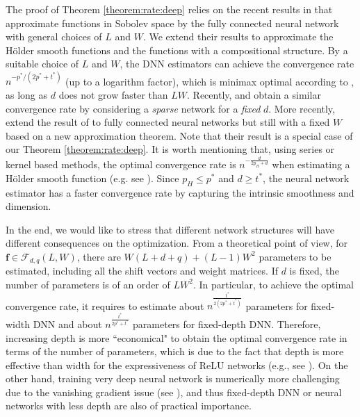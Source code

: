 \documentclass[11pt, preprint]{imsart}
\numberwithin{equation}{section}
\def \mcF{\mathcal{F}}
\def \bff{\mathbf{f}}
\def \bff{\mathbf{f}}
\theoremstyle{plain}
\newtheorem{theorem}{\indent Theorem}
\theoremstyle{definition}
\begin{document}
The proof of Theorem \ref{theorem:rate:deep} relies on the recent results in \cite{lsyz20} that approximate functions in Sobolev space by the fully connected neural network with general choices of $L$ and $W$. We extend their results to approximate the H\" older smooth functions and the functions with a compositional structure. By a suitable choice of $L$ and $W$, the DNN estimators can achieve the convergence rate $n^{-p^*/(2p^*+t^*)}$ (up to a logarithm factor), which is minimax optimal according to \cite{s19}, as long as $d$ does not grow faster than $LW$. Recently, \cite{bk19} and \cite{s19} obtain a similar convergence rate by considering a {\em sparse} network for a {\em fixed} $d$. More recently, \cite{mk19} extend the result of \cite{bk19} to fully connected neural networks but still with a fixed $W$ based on a new approximation theorem. Note that their result is a special case of our Theorem \ref{theorem:rate:deep}. It is worth mentioning that, using series or kernel based methods, the optimal convergence rate is $n^{-\frac{d}{2p_H+d}}$ when estimating a H\" older smooth function (e.g. see \citealp{s94,s19}). Since $p_H\leq p^*$ and $d \geq t^*$, the neural network estimator has a faster convergence rate by capturing the intrinsic smoothness and dimension.

In the end, we would like to stress that different network structures will have different consequences on the optimization. From a theoretical point of view, for $\bff \in \mcF_{d,q}(L, W)$, there are $W(L+d+q)+(L-1)W^2$ parameters to be estimated, including all the shift vectors and weight matrices. If $d$ is fixed, the number of parameters is of an order of $LW^2$. In particular, to achieve the optimal convergence rate, it requires to estimate about $n^{\frac{t^*}{2(2p^*+t^*)}}$ parameters for fixed-width DNN and about $n^{\frac{t^*}{2p^*+t^*}}$ parameters for fixed-depth DNN. Therefore, increasing depth is more ``economical" to obtain the optimal convergence rate in terms of the number of parameters, which is due to the fact that depth is more effective than width for the expressiveness of
ReLU networks (e.g., see \citealp{lpwhw17,yz19,lsyz20}). On the other hand, training very deep neural network is numerically more challenging due to the vanishing gradient issue (see \citealp{sgs15}), and thus fixed-depth DNN or neural networks with less depth are also of practical importance.
\end{document}
